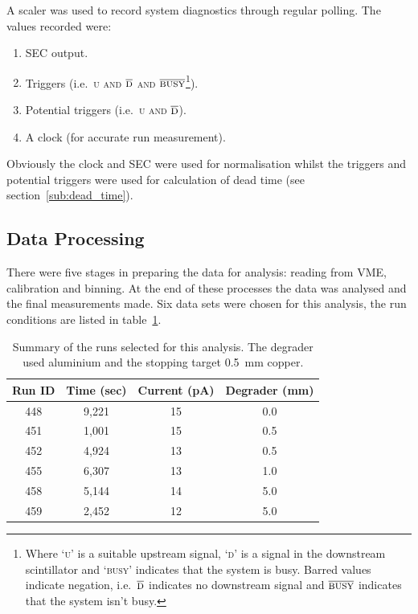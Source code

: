 A scaler was used to record system diagnostics through regular polling. The values recorded were:
\begin{enumerate}
  \item SEC output.
  \item Triggers (i.e.\ \textsc{u and }\(\overline{\textsc{d}}\)\textsc{ and }\(\overline{\textsc{busy}}\)\footnote{Where `\textsc{u}' is a suitable upstream signal, `\textsc{d}' is a signal in the downstream scintillator and `\textsc{busy}' indicates that the system is busy. Barred values indicate negation, i.e.\ \(\overline{\textsc{d}}\) indicates no downstream signal and \(\overline{\textsc{busy}}\) indicates that the system isn't busy.}).
  \item Potential triggers (i.e.\ \textsc{u and }\(\overline{\textsc{d}}\)).
  \item A clock (for accurate run measurement).
\end{enumerate}
Obviously the clock and SEC were used for normalisation whilst the triggers and potential triggers were used for calculation of dead time (see section~\ref{sub:dead_time}).

\subsection{Data Processing} %
\label{sec:data_processing}
There were five stages in preparing the data for analysis: reading from VME, calibration and binning. At the end of these processes the data was analysed and the final measurements made. Six data sets were chosen for this analysis, the run conditions are listed in table~\ref{tab:run_summary}.

\begin{table}
	\begin{center}
	\begin{tabular}{c|c|c|c}
		Run ID & Time (sec) & Current (pA) & Degrader (mm) \\
		\hline
		448    & 9,221      & 15           & 0.0   \\
		451    & 1,001      & 15           & 0.5   \\
		452    & 4,924      & 13           & 0.5   \\
		455    & 6,307      & 13           & 1.0   \\
		458    & 5,144      & 14           & 5.0   \\
		459    & 2,452      & 12           & 5.0   \\
	\end{tabular}
	\end{center}
	\caption{Summary of the runs selected for this analysis. The degrader used aluminium and the stopping target 0.5~mm copper.}
	\label{tab:run_summary}
\end{table} 

